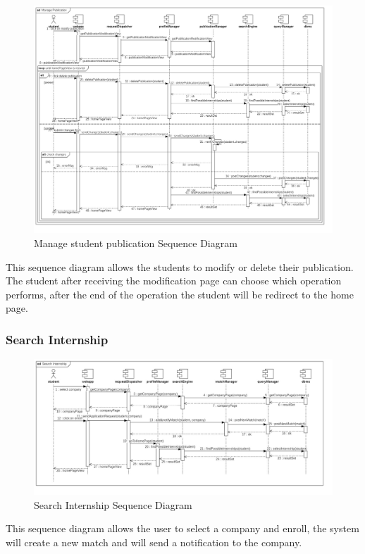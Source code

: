 \documentclass{article}
\begin{document}
\begin{figure}[H]
    \centering
    \includegraphics[width=1\linewidth]{SequenceDiagram/Manage Publication.jpg}
    \caption{Manage student publication Sequence Diagram}
    \label{fig:enter-label}
\end{figure}
This sequence diagram allows the students to modify or delete their publication. 
The student after receiving the modification page can choose which operation performs, after the end of the operation the student will be redirect to the home page.

\subsubsection{Search Internship}

\begin{figure}[H]
    \centering
    \includegraphics[width=1\linewidth]{SequenceDiagram/Search Internship.jpg}
    \caption{Search Internship Sequence Diagram}
    \label{fig:enter-label}
\end{figure}
This sequence diagram allows the user to select a company and enroll, the system will create a new match and will send a notification to the company.
\end{document}
